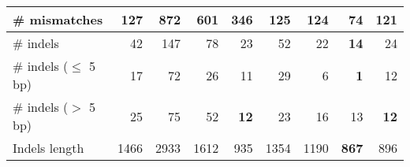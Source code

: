 \documentclass[12pt,a4paper]{article}
\begin{document}
\begin{table}[ht]
\begin{center}
\begin{tabular}{|l*{8}{|r}|}
\# mismatches & 127 & 872 & 601 & 346 & 125 & 124 & {\bf 74} & 121 \\ \hline
\# indels & 42 & 147 & 78 & 23 & 52 & 22 & {\bf 14} & 24 \\ \hline
\hspace{5mm}\# indels ($\leq$ 5 bp) & 17 & 72 & 26 & 11 & 29 & 6 & {\bf 1} & 12 \\ \hline
\hspace{5mm}\# indels ($>$ 5 bp) & 25 & 75 & 52 & {\bf 12} & 23 & 16 & 13 & {\bf 12} \\ \hline
Indels length & 1466 & 2933 & 1612 & 935 & 1354 & 1190 & {\bf 867} & 896 \\ \hline
\end{tabular}
\end{center}
\end{table}
\end{document}
